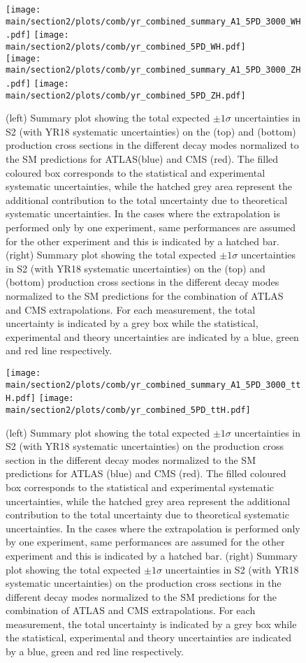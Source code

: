 \begin{figure}[hbtp]
\centering
\texttt{[image: \\main/section2/plots/comb/yr\_combined\_summary\_A1\_5PD\_3000\_WH.pdf]}%
\texttt{[image: \\main/section2/plots/comb/yr\_combined\_5PD\_WH.pdf]}\\
\texttt{[image: \\main/section2/plots/comb/yr\_combined\_summary\_A1\_5PD\_3000\_ZH.pdf]}%
\texttt{[image: \\main/section2/plots/comb/yr\_combined\_5PD\_ZH.pdf]}%
\caption{(left) Summary plot showing the total expected $\pm 1\sigma$ uncertainties in S2 (with YR18 systematic uncertainties) on the \wh (top) and \zh (bottom) production cross sections in the different decay modes normalized to the SM predictions   for ATLAS(blue)  and CMS (red). The filled coloured box corresponds to the statistical and experimental systematic uncertainties, while the hatched grey area represent the additional contribution to the total uncertainty due to theoretical systematic uncertainties. In the cases where  the extrapolation is performed only by one experiment, same performances are assumed for the other experiment and this is indicated by a  hatched bar.
(right) Summary plot showing the total expected $\pm 1\sigma$  uncertainties in S2 (with YR18 systematic uncertainties) on the \wh (top) and \zh (bottom) production cross sections in the different decay modes normalized to the SM predictions for the combination of ATLAS and CMS extrapolations. For each measurement,  the total uncertainty is indicated by a grey box while the statistical, experimental and theory uncertainties are indicated by a blue, green and red line respectively.}
\label{fig:summary_A1_5PD_WH_ZH}
\end{figure}


\begin{figure}[hbtp]
\centering
\texttt{[image: \\main/section2/plots/comb/yr\_combined\_summary\_A1\_5PD\_3000\_ttH.pdf]}%
\texttt{[image: \\main/section2/plots/comb/yr\_combined\_5PD\_ttH.pdf]}
\caption{(left) Summary plot showing the total expected $\pm 1\sigma$ uncertainties in S2 (with YR18 systematic uncertainties) on the \tth production cross section in the different decay modes normalized to the SM predictions   for ATLAS (blue)  and CMS (red). The filled coloured box corresponds to the statistical and experimental systematic uncertainties, while the hatched grey area represent the additional contribution to the total uncertainty due to theoretical systematic uncertainties. In the cases where  the extrapolation is performed only by one experiment, same performances are assumed for the other experiment and this is indicated by a  hatched bar.
(right) Summary plot showing the total expected $\pm 1\sigma$  uncertainties in S2 (with YR18 systematic uncertainties) on the \tth production cross sections in the different decay modes normalized to the SM predictions for the combination of ATLAS and CMS extrapolations. For each measurement,  the total uncertainty is indicated by a grey box while the statistical, experimental and theory uncertainties are indicated by a blue, green and red line respectively.}
\label{fig:summary_A1_5PD_ttH}
\end{figure}


